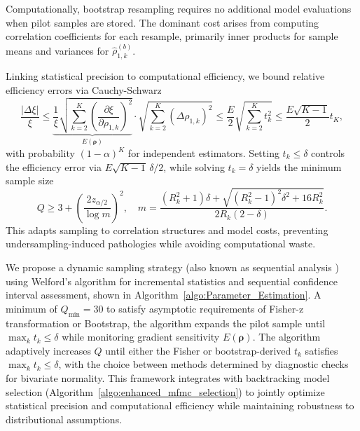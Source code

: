 Computationally, bootstrap resampling requires no additional model evaluations when pilot samples are stored. The dominant cost arises from computing correlation coefficients for each resample, primarily inner products for sample means and variances for $\widehat{\rho}_{1,k}^{(b)}$.


Linking statistical precision to computational efficiency, we bound relative efficiency errors via Cauchy-Schwarz
%
\begin{equation}\label{eq:delta_xi_bound}
    \frac{\left|\Delta \xi\right|}{\xi}\le \underbrace{\frac{1}{\xi}\sqrt{\sum_{k=2}^K \left(\frac{\partial \xi}{\partial \rho_{1,k}}\right)^2}}_{E(\boldsymbol{\rho})} \cdot \sqrt{\sum_{k=2}^K\left(\Delta\rho_{1,k}\right)^2}
    \le \frac{E}{2} \sqrt{\sum_{k=2}^K t_k^2}\le \frac{E\sqrt{K-1}}{2}t_K,
\end{equation}
%
with probability $(1-\alpha)^K$  for independent estimators.  Setting $t_k \leq \delta$ controls the efficiency error via $E\sqrt{K-1}\,\delta/2$, while solving $t_k = \delta$ yields the minimum sample size
%
\begin{equation*}\label{eq:Pilot_sample_size_estimate}
Q \geq 3 + \left( \frac{2 z_{\alpha/2}}{\log m} \right)^2, \quad m = \frac{(R_k^2 + 1) \delta + \sqrt{(R_k^2 - 1)^2 \delta^2 + 16 R_k^2}}{2 R_k (2 - \delta)}.
\end{equation*}
%
This adapts sampling to correlation structures and model costs, preventing undersampling-induced pathologies while avoiding computational waste.

We propose a dynamic sampling strategy (also known as sequential analysis \cite{La:2001,Wa:1947}) using Welford's algorithm for incremental statistics and sequential confidence interval assessment, shown in Algorithm~\ref{algo:Parameter_Estimation}. A minimum of  $Q_{\min}=30$ to satisfy asymptotic requirements of Fisher-z transformation or Bootstrap, the algorithm expands the pilot sample until $\max_k t_k \leq \delta$ while monitoring gradient sensitivity $E(\boldsymbol{\rho})$. The algorithm adaptively increases $Q$ until either the Fisher or bootstrap-derived $t_k$ satisfies $\max_k t_k \leq \delta$, with the choice between methods determined by diagnostic checks for bivariate normality. This framework integrates with backtracking model selection (Algorithm~\ref{algo:enhanced_mfmc_selection}) to jointly optimize statistical precision and computational efficiency while maintaining robustness to distributional assumptions.


